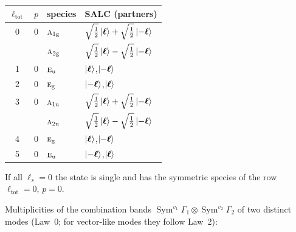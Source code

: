 \documentclass[11pt]{article}
\newcommand{\irr}[1]{\text{\normalfont\scshape #1}}
\newcommand{\ptag}[1]{\mathrm{#1}}
\begin{document}
\begin{longtable}{c c l l}\hline $\ell_{\mathrm{tot}}$ & $p$ & species & SALC (partners)\\ \hline\endhead

0 & 0 & $\irr{a}_{1\ptag{g}}$ & $\sqrt{\tfrac{1}{2}}\ket{\boldsymbol\ell}+\sqrt{\tfrac{1}{2}}\ket{-\boldsymbol\ell}$\\

& & $\irr{a}_{2\ptag{g}}$ & $\sqrt{\tfrac{1}{2}}\ket{\boldsymbol\ell}-\sqrt{\tfrac{1}{2}}\ket{-\boldsymbol\ell}$\\

1 & 0 & $\irr{e}_{\ptag{u}}$ & $\ket{\boldsymbol\ell}$,\quad $\ket{-\boldsymbol\ell}$\\

2 & 0 & $\irr{e}_{\ptag{g}}$ & $\ket{-\boldsymbol\ell}$,\quad $\ket{\boldsymbol\ell}$\\

3 & 0 & $\irr{a}_{1\ptag{u}}$ & $\sqrt{\tfrac{1}{2}}\ket{\boldsymbol\ell}+\sqrt{\tfrac{1}{2}}\ket{-\boldsymbol\ell}$\\

& & $\irr{a}_{2\ptag{u}}$ & $\sqrt{\tfrac{1}{2}}\ket{\boldsymbol\ell}-\sqrt{\tfrac{1}{2}}\ket{-\boldsymbol\ell}$\\

4 & 0 & $\irr{e}_{\ptag{g}}$ & $\ket{\boldsymbol\ell}$,\quad $\ket{-\boldsymbol\ell}$\\

5 & 0 & $\irr{e}_{\ptag{u}}$ & $\ket{-\boldsymbol\ell}$,\quad $\ket{\boldsymbol\ell}$\\

\hline\end{longtable}

If all $\ell_s=0$ the state is single and has the symmetric species of the row $\ell_{\mathrm{tot}}=0$, $p=0$.

Multiplicities of the combination bands $\operatorname{Sym}^{v_1}\Gamma_1\otimes\operatorname{Sym}^{v_2}\Gamma_2$ of two distinct modes (Law~0; for vector-like modes they follow Law~2):
\end{document}
